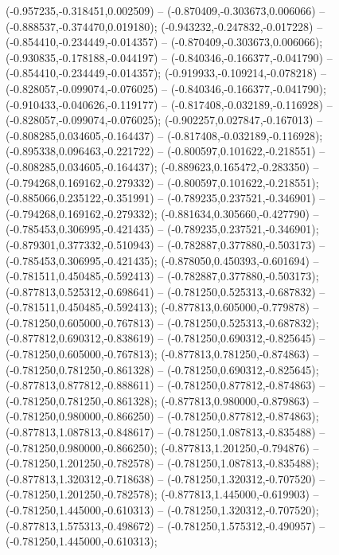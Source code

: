  (-0.957235,-0.318451,0.002509) -- (-0.870409,-0.303673,0.006066) -- (-0.888537,-0.374470,0.019180);
 (-0.943232,-0.247832,-0.017228) -- (-0.854410,-0.234449,-0.014357) -- (-0.870409,-0.303673,0.006066);
 (-0.930835,-0.178188,-0.044197) -- (-0.840346,-0.166377,-0.041790) -- (-0.854410,-0.234449,-0.014357);
 (-0.919933,-0.109214,-0.078218) -- (-0.828057,-0.099074,-0.076025) -- (-0.840346,-0.166377,-0.041790);
 (-0.910433,-0.040626,-0.119177) -- (-0.817408,-0.032189,-0.116928) -- (-0.828057,-0.099074,-0.076025);
 (-0.902257,0.027847,-0.167013) -- (-0.808285,0.034605,-0.164437) -- (-0.817408,-0.032189,-0.116928);
 (-0.895338,0.096463,-0.221722) -- (-0.800597,0.101622,-0.218551) -- (-0.808285,0.034605,-0.164437);
 (-0.889623,0.165472,-0.283350) -- (-0.794268,0.169162,-0.279332) -- (-0.800597,0.101622,-0.218551);
 (-0.885066,0.235122,-0.351991) -- (-0.789235,0.237521,-0.346901) -- (-0.794268,0.169162,-0.279332);
 (-0.881634,0.305660,-0.427790) -- (-0.785453,0.306995,-0.421435) -- (-0.789235,0.237521,-0.346901);
 (-0.879301,0.377332,-0.510943) -- (-0.782887,0.377880,-0.503173) -- (-0.785453,0.306995,-0.421435);
 (-0.878050,0.450393,-0.601694) -- (-0.781511,0.450485,-0.592413) -- (-0.782887,0.377880,-0.503173);
 (-0.877813,0.525312,-0.698641) -- (-0.781250,0.525313,-0.687832) -- (-0.781511,0.450485,-0.592413);
 (-0.877813,0.605000,-0.779878) -- (-0.781250,0.605000,-0.767813) -- (-0.781250,0.525313,-0.687832);
 (-0.877812,0.690312,-0.838619) -- (-0.781250,0.690312,-0.825645) -- (-0.781250,0.605000,-0.767813);
 (-0.877813,0.781250,-0.874863) -- (-0.781250,0.781250,-0.861328) -- (-0.781250,0.690312,-0.825645);
 (-0.877813,0.877812,-0.888611) -- (-0.781250,0.877812,-0.874863) -- (-0.781250,0.781250,-0.861328);
 (-0.877813,0.980000,-0.879863) -- (-0.781250,0.980000,-0.866250) -- (-0.781250,0.877812,-0.874863);
 (-0.877813,1.087813,-0.848617) -- (-0.781250,1.087813,-0.835488) -- (-0.781250,0.980000,-0.866250);
 (-0.877813,1.201250,-0.794876) -- (-0.781250,1.201250,-0.782578) -- (-0.781250,1.087813,-0.835488);
 (-0.877813,1.320312,-0.718638) -- (-0.781250,1.320312,-0.707520) -- (-0.781250,1.201250,-0.782578);
 (-0.877813,1.445000,-0.619903) -- (-0.781250,1.445000,-0.610313) -- (-0.781250,1.320312,-0.707520);
 (-0.877813,1.575313,-0.498672) -- (-0.781250,1.575312,-0.490957) -- (-0.781250,1.445000,-0.610313);
